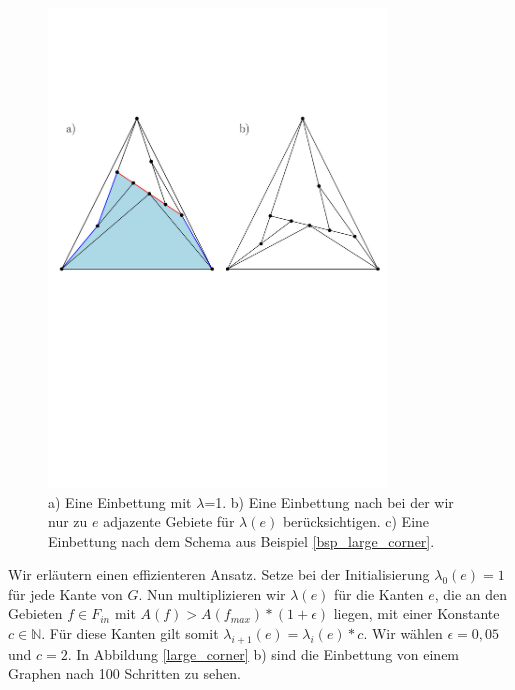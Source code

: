 \begin{figure}
	\centering
  \includegraphics[width=0.8\textwidth]{example1_vis.pdf}
  \caption{a) Eine Einbettung mit $\lambda$=1. b) Eine Einbettung nach bei der wir nur zu $e$ adjazente Gebiete für $\lambda(e)$ berücksichtigen. c) Eine Einbettung nach dem Schema aus Beispiel \ref{bsp_large_corner}.}
  \label{long_segment}
\end{figure}

\begin{example}\label{bsp_large_corner}
Wir erläutern einen effizienteren Ansatz. Setze bei der Initialisierung $\lambda_0(e)=1$ für jede Kante von $G$. Nun multiplizieren wir $\lambda(e)$ für die Kanten $e$, die an den Gebieten $f\in F_{in}$ mit $A(f) > A(f_{max})*(1+\epsilon)$ liegen, mit einer Konstante $c \in \mathbb{N}$. Für diese Kanten gilt somit $\lambda_{i+1}(e) = \lambda_{i}(e)*c$. Wir wählen $\epsilon = 0,05$ und $c=2$. In Abbildung \ref{large_corner} b) sind die Einbettung von einem Graphen nach 100 Schritten zu sehen.
\end{example}

